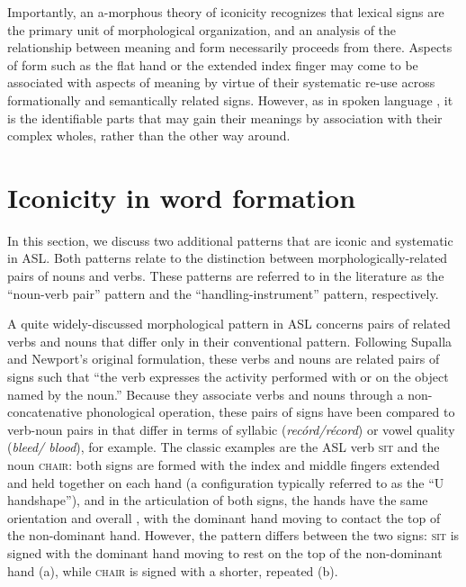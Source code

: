 \documentclass[output=paper,
modfonts
]{LSP/langsci}
\begin{document}
  Importantly, an a-morphous theory of iconicity recognizes that lexical signs are the primary unit of morphological organization, and an analysis of the relationship between meaning and form necessarily proceeds from there. Aspects of form such as the flat hand or the extended index finger may come to be associated with aspects of meaning by virtue of their systematic re-use across formationally and semantically related signs. However, as in spoken language , it is the identifiable parts that may gain their meanings by association with their complex wholes, rather than the other way around.

\section{Iconicity in word formation}

In this section, we discuss two additional patterns that are iconic and systematic in ASL. Both patterns relate to the distinction between morphologically-related pairs of nouns and verbs. These patterns are referred to in the literature as the ``noun-verb pair'' pattern and the ``handling-instrument'' pattern, respectively.

  A quite widely-discussed morphological pattern in ASL concerns pairs of related verbs and nouns that differ only in their conventional  pattern. Following Supalla and Newport's \citeyearpar[100--102]{Supalla1978} original formulation, these verbs and nouns are related pairs of signs such that ``the verb expresses the activity performed with or on the object named by the noun.'' Because they associate verbs and nouns through a non-concate\-native phonological operation, these pairs of signs have been compared to verb-noun pairs in  that differ in terms of syllabic  (\textit{recórd/récord}) or vowel quality (\textit{bleed/ blood}), for example. The classic examples are the ASL verb \textsc{sit} and the noun \textsc{chair}: both signs are formed with the index and middle fingers extended and held together on each hand (a configuration typically referred to as the ``U handshape''), and in the articulation of both signs, the hands have the same orientation and overall , with the dominant hand moving to contact the top of the non-dominant hand. However, the  pattern differs between the two signs: \textsc{sit} is signed with the dominant hand moving to rest on the top of the non-dominant hand (a), while \textsc{chair} is signed with a shorter, repeated  (b).
  
\end{document}
